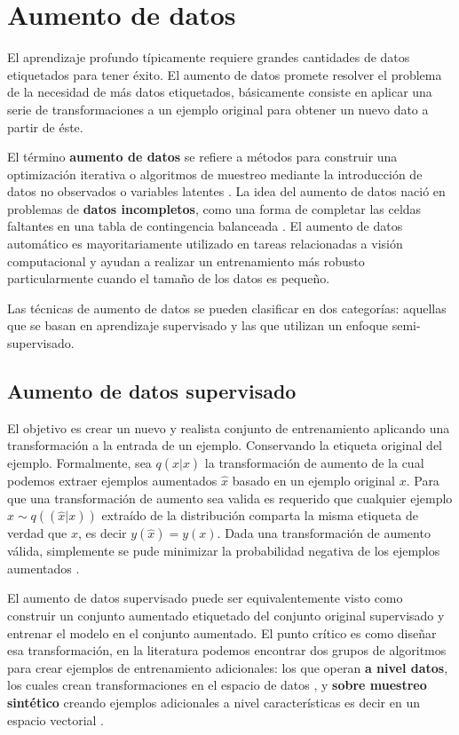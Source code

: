 
\section{Aumento de datos}

El aprendizaje profundo típicamente requiere grandes cantidades de datos etiquetados para tener éxito. El aumento de datos promete resolver el problema de la necesidad de más datos etiquetados, básicamente consiste en aplicar una serie de transformaciones a un ejemplo original para obtener un nuevo dato a partir de éste.

El término \textbf{aumento de datos} se refiere a métodos para construir una optimización iterativa o algoritmos de muestreo mediante la introducción de datos no observados o variables latentes \cite{van2001art}. La idea del aumento de datos nació en problemas de \textbf{datos incompletos}, como una forma de completar las celdas faltantes en una tabla de contingencia balanceada \cite{dempster1977maximum}. El aumento de datos automático es mayoritariamente utilizado en tareas relacionadas a visión computacional y ayudan a realizar un entrenamiento más robusto particularmente cuando el tamaño de los datos es pequeño. 


Las técnicas de aumento de datos se pueden clasificar en dos categorías: aquellas que se basan en aprendizaje supervisado y las que utilizan un enfoque semi-supervisado.

\subsection{Aumento de datos supervisado} El objetivo es crear un nuevo y realista conjunto de entrenamiento aplicando una transformación a la entrada de un ejemplo. Conservando la etiqueta original del ejemplo. Formalmente, sea $q(\hat{x}|x)$ la transformación de aumento de la cual podemos extraer  ejemplos aumentados $\hat{x}$ basado en un ejemplo original $x$. Para que una transformación de aumento sea valida es requerido que cualquier ejemplo $\hat{x} \sim q((\hat{x}|x))$ extraído de la distribución comparta la misma etiqueta de verdad que $x$, es decir $y(\hat{x})=y(x)$. Dada una transformación de aumento válida, simplemente se pude minimizar la probabilidad negativa de los ejemplos aumentados \cite{xie2019unsupervised}.

El aumento de datos supervisado puede ser equivalentemente visto como construir un conjunto aumentado etiquetado del conjunto original supervisado y entrenar el modelo en el conjunto aumentado. El punto crítico es como diseñar esa transformación, en la literatura podemos encontrar dos grupos de algoritmos para crear ejemplos de entrenamiento adicionales: los que operan \textbf{a nivel datos}, los cuales crean transformaciones en el espacio de datos \cite{zhong2017random}, y \textbf{sobre muestreo sintético} creando ejemplos adicionales a nivel características es decir en un espacio vectorial \cite{chawla2002smote}. 

